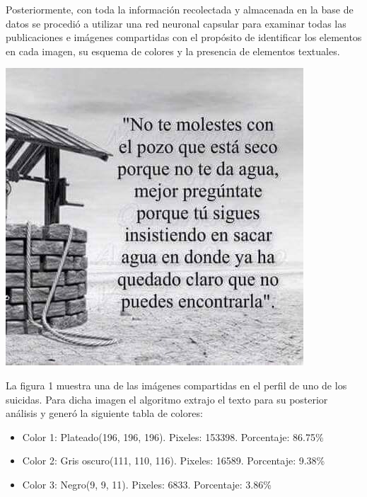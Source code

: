 \documentclass[12pt, donotrepeattitle, jou]{apa6}
\begin{document}
    Posteriormente, con toda la información recolectada y almacenada en la base de datos se procedió a utilizar una red neuronal capsular para examinar todas las publicaciones e imágenes compartidas con el propósito de identificar los elementos en cada imagen, su esquema de colores y la presencia de elementos textuales.
    
    \begin{center}
        \begin{minipage}{0.6\linewidth}
            \includegraphics[width=\linewidth]{images/1}
        \end{minipage}
    \end{center}
    
    La figura 1 muestra una de las imágenes compartidas en el perfil de uno de los suicidas. Para dicha imagen el algoritmo extrajo el texto para su posterior análisis y generó la siguiente tabla de colores:
    \begin{itemize}
        \item Color 1: Plateado(196, 196, 196). Pixeles: 153398. Porcentaje: 86.75\%
        \item Color 2: Gris oscuro(111, 110, 116). Pixeles: 16589. Porcentaje: 9.38\%
        \item Color 3: Negro(9, 9, 11). Pixeles: 6833. Porcentaje: 3.86\%
    \end{itemize}
\end{document}
